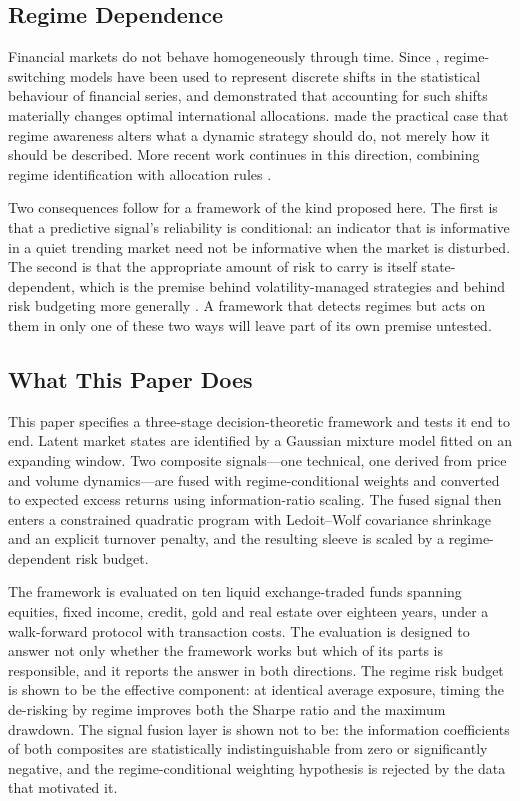 \documentclass{singlecol-new}
\theoremstyle{TH}{
\newtheorem{lemma}{Lemma}
\newtheorem{theorem}[lemma]{Theorem}
\newtheorem{corrolary}[lemma]{Corrolary}
\newtheorem{conjecture}[lemma]{Conjecture}
\newtheorem{proposition}[lemma]{Proposition}
\newtheorem{claim}[lemma]{Claim}
\newtheorem{stheorem}[lemma]{Wrong Theorem}
\newtheorem{algorithm}{Algorithm}
}
\theoremstyle{THrm}{
\newtheorem{definition}{Definition}[section]
\newtheorem{question}{Question}[section]
\newtheorem{remark}{Remark}
\newtheorem{scheme}{Scheme}
}
\theoremstyle{THhit}{
\newtheorem{case}{Case}[section]
}
\begin{document}
\subsection{Regime Dependence}

Financial markets do not behave homogeneously through time. Since \citet{hamilton89},
regime-switching models have been used to represent discrete shifts in the statistical
behaviour of financial series, and \citet{angbekaert02} demonstrated that accounting for
such shifts materially changes optimal international allocations. \citet{kritzman12}
made the practical case that regime awareness alters what a dynamic strategy should do,
not merely how it should be described. More recent work continues in this direction,
combining regime identification with allocation rules \citep{li25, luo26}.

Two consequences follow for a framework of the kind proposed here. The first is that a
predictive signal's reliability is conditional: an indicator that is informative in a
quiet trending market need not be informative when the market is disturbed. The second
is that the appropriate amount of risk to carry is itself state-dependent, which is the
premise behind volatility-managed strategies \citep{moreira17, hood25} and behind risk
budgeting more generally \citep{asimit25}. A framework that detects regimes but acts on
them in only one of these two ways will leave part of its own premise untested.

\subsection{What This Paper Does}

This paper specifies a three-stage decision-theoretic framework and tests it end to
end. Latent market states are identified by a Gaussian mixture model fitted on an
expanding window. Two composite signals---one technical, one derived from price and
volume dynamics---are fused with regime-conditional weights and converted to expected
excess returns using information-ratio scaling. The fused signal then enters a
constrained quadratic program with Ledoit--Wolf covariance shrinkage
\citep{ledoit04} and an explicit turnover penalty, and the resulting sleeve is scaled by
a regime-dependent risk budget.

The framework is evaluated on ten liquid exchange-traded funds spanning equities, fixed
income, credit, gold and real estate over eighteen years, under a walk-forward protocol
with transaction costs. The evaluation is designed to answer not only whether the
framework works but which of its parts is responsible, and it reports the answer in
both directions. The regime risk budget is shown to be the effective component: at
identical average exposure, timing the de-risking by regime improves both the Sharpe
ratio and the maximum drawdown. The signal fusion layer is shown not to be: the
information coefficients of both composites are statistically indistinguishable from
zero or significantly negative, and the regime-conditional weighting hypothesis is
rejected by the data that motivated it.
\end{document}
